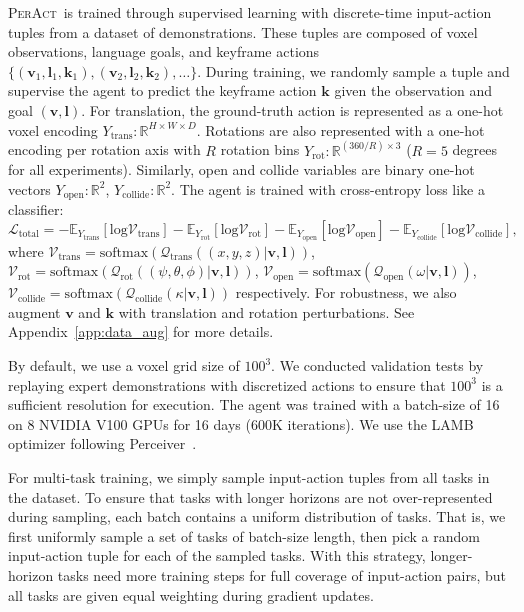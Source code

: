 \documentclass{article}
\newcommand{\appsecref}[1]{Appendix~\ref{#1}}
\newcommand{\inputvl}{$(\mathbf{v}, \mathbf{l})$}
\newcommand{\model}{\textsc{PerAct}}
\begin{document}
\model~is trained through supervised learning with discrete-time input-action tuples from a dataset of demonstrations. These tuples are composed of voxel observations, language goals, and keyframe actions $\{(\mathbf{v}_{1}, \mathbf{l}_{1}, \mathbf{k}_{1}), (\mathbf{v}_{2}, \mathbf{l}_{2}, \mathbf{k}_{2}), \ldots\}$. During training, we randomly sample a tuple and supervise the agent to predict the keyframe action $\mathbf{k}$ given the observation and goal \inputvl. For translation, the ground-truth action is represented as a one-hot voxel encoding $Y_{\textrm{trans}} : \mathbb{R}^{H \times W \times D}$. Rotations are also represented with a one-hot encoding per rotation axis with $R$ rotation bins $Y_{\textrm{rot}} : \mathbb{R}^{(360/R) \times 3}$  ($R=5$ degrees for all experiments). Similarly, open and collide variables are binary one-hot vectors $Y_{\textrm{open}} : \mathbb{R}^{2}$, $Y_{\textrm{collide}} : \mathbb{R}^{2}$. The agent is trained with cross-entropy loss like a  classifier: 
\begin{equation*}
    \mathcal{L}_{\textrm{total}} = - \mathbb{E}_{Y_{\textrm{trans}}}[\textrm{log} \mathcal{V}_{\textrm{trans}}] - \mathbb{E}_{Y_{\textrm{rot}}}[\textrm{log} \mathcal{V}_{\textrm{rot}}] - \mathbb{E}_{Y_{\textrm{open}}}[\textrm{log} \mathcal{V}_{\textrm{open}}] -
    \mathbb{E}_{Y_{\textrm{collide}}}[\textrm{log} \mathcal{V}_{\textrm{collide}}],
\end{equation*}
where $\mathcal{V}_{\textrm{trans}} = \textrm{softmax}(\mathcal{Q}_{\textrm{trans}}((x,y,z) | \mathbf{v}, \mathbf{l}))$, $\mathcal{V}_{\textrm{rot}} = \textrm{softmax}(\mathcal{Q}_{\textrm{rot}}((\psi, \theta, \phi) | \mathbf{v}, \mathbf{l}))$, $\mathcal{V}_{\textrm{open}} = \textrm{softmax}(\mathcal{Q}_{\textrm{open}}(\omega | \mathbf{v}, \mathbf{l}))$, $\mathcal{V}_{\textrm{collide}} = \textrm{softmax}(\mathcal{Q}_{\textrm{collide}}(\kappa | \mathbf{v}, \mathbf{l}))$ respectively. For robustness, we also augment $\mathbf{v}$ and $\mathbf{k}$ with translation and rotation perturbations. See \appsecref{app:data_aug} for more details.

By default, we use a voxel grid size of $100^3$. We conducted validation tests by replaying expert demonstrations with discretized actions to ensure that $100^3$ is a sufficient resolution for execution. The agent was trained with a batch-size of 16 on 8 NVIDIA V100 GPUs for 16 days (600K iterations). We use the LAMB~\citep{you2019large} optimizer following Perceiver~\citep{jaegle2021perceiver}.

For multi-task training, we simply sample input-action tuples from all tasks in the dataset. To ensure that tasks with longer horizons are not over-represented during sampling, each batch contains a uniform distribution of tasks. That is, we first uniformly sample a set of tasks of batch-size length, then pick a random input-action tuple for each of the sampled tasks. With this strategy, longer-horizon tasks need more training steps for full coverage of input-action pairs, but all tasks are given equal weighting during gradient updates.
\end{document}
